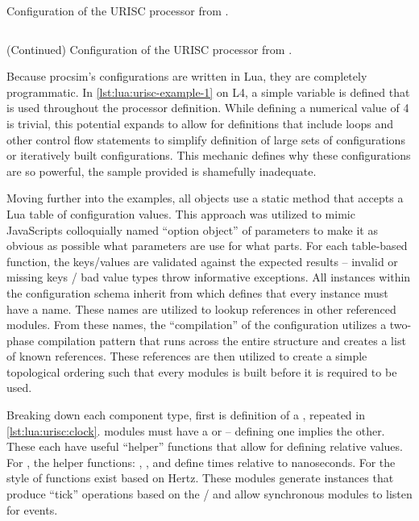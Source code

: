 \begin{listing}[hp!]
    \inputminted[escapeinside=||, lastline=42]{lua}{./listings/urisc.lua}
    \caption{Configuration of the URISC processor from \cite{Mavaddat1988}.}
    \label{lst:lua:urisc-example-1}
\end{listing}

\begin{listing*}[hp!]
    \inputminted[escapeinside=||, firstline=45]{lua}{./listings/urisc.lua}
    \caption{(Continued) Configuration of the URISC processor from \cite{Mavaddat1988}.}
    \label{lst:lua:urisc-example-2}
\end{listing*}

Because procsim's configurations are written in Lua, they are completely programmatic. In \cref{lst:lua:urisc-example-1} on L4, a simple variable is defined that is used throughout the processor definition. While defining a numerical value of 4 is trivial, this potential expands to allow for definitions that include loops and other control flow statements to simplify definition of large sets of configurations or iteratively built configurations. This mechanic defines why these configurations are so powerful, the sample provided is shamefully inadequate. 

Moving further into the examples, all objects use a static  method that accepts a Lua table of configuration values. This approach was utilized to mimic JavaScripts colloquially named ``option object'' of parameters to make it as obvious as possible what parameters are use for what parts. For each table-based function, the keys/values are validated against the expected results -- invalid or missing keys / bad value types throw informative exceptions. All instances within the configuration schema inherit from  which defines that every instance must have a name. These names are utilized to lookup references in other referenced modules. From these names, the ``compilation'' of the configuration utilizes a two-phase compilation pattern that runs across the entire structure and creates a list of known references. These references are then utilized to create a simple topological ordering such that every modules is built before it is required to be used. 

Breaking down each component type, first is definition of a , repeated in \cref{lst:lua:urisc:clock}.  modules must have a  or  -- defining one implies the other. These each have useful ``helper'' functions that allow for defining relative values. For , the helper functions: , ,  and  define times relative to nanoseconds. For  the style of functions exist based on Hertz. These  modules generate instances that produce ``tick'' operations based on the / and allow synchronous modules to listen for events. 

